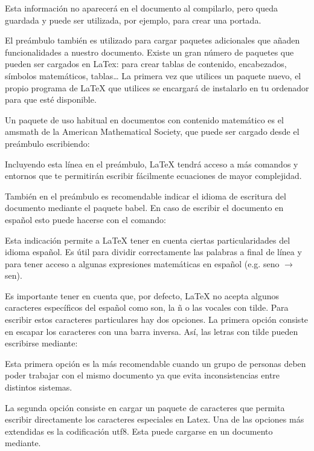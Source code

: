\documentclass[11pt, a4paper]{article}
\begin{document}

Esta información no aparecerá en el documento al compilarlo, pero queda guardada y puede ser utilizada, por ejemplo, para crear una portada.

El preámbulo también es utilizado para cargar paquetes adicionales que añaden funcionalidades a nuestro documento. Existe un gran número de paquetes que pueden ser cargados en LaTex: para crear tablas de contenido, encabezados, símbolos matemáticos, tablas… La primera vez que utilices un paquete nuevo, el propio programa de LaTeX que utilices se encargará de instalarlo en tu ordenador para que esté disponible.

Un paquete de uso habitual en documentos con contenido matemático es el amsmath de la American Mathematical Society, que puede ser cargado desde el preámbulo escribiendo:


Incluyendo esta línea en el preámbulo, LaTeX tendrá acceso a más comandos y entornos que te permitirán escribir fácilmente ecuaciones de mayor complejidad.

También en el preámbulo es recomendable indicar el idioma de escritura del documento mediante el paquete babel. En caso de escribir el documento en español esto puede hacerse con el comando:


Esta indicación permite a LaTeX tener en cuenta ciertas particularidades del idioma español. Es útil para dividir correctamente las palabras a final de línea y para tener acceso a algunas expresiones matemáticas en español (e.g. seno $\to$ sen).

Es importante tener en cuenta que, por defecto, LaTeX no acepta algunos caracteres específicos del español como son, la ñ o las vocales con tilde. Para escribir estos caracteres particulares hay dos opciones. La primera opción consiste en escapar los caracteres con una barra inversa. Así, las letras con tilde pueden escribirse mediante:

Esta primera opción es la más recomendable cuando un grupo de personas deben poder trabajar con el mismo documento ya que evita inconsistencias entre distintos sistemas.

La segunda opción consiste en cargar un paquete de caracteres que permita escribir directamente los caracteres especiales en Latex. Una de las opciones más extendidas es la codificación utf8. Esta puede cargarse en un documento mediante.
\end{document}
